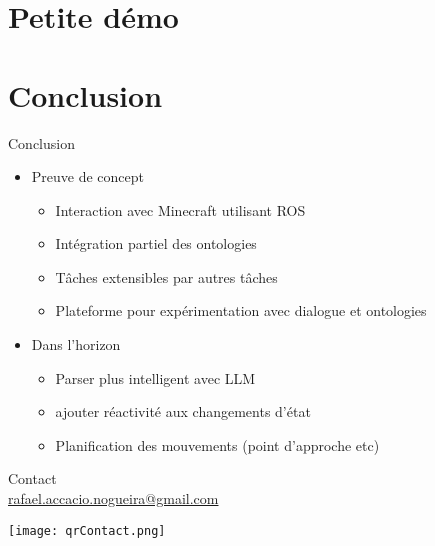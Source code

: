 \documentclass[aspectratio=169]{audition-beamer}
\begin{document}
\section{Petite démo}

\section{Conclusion}

\begin{frame}{Conclusion}
  \begin{itemize}[<+->]
    \item Preuve de concept
          \begin{itemize}[<+->]
            \item Interaction avec Minecraft utilisant ROS
            \item Intégration partiel des ontologies
            \item Tâches extensibles par autres tâches
            \item Plateforme pour expérimentation avec dialogue et ontologies
          \end{itemize}
  \end{itemize}

  \begin{itemize}[<+->]
    \item Dans l'horizon
          \begin{itemize}[<+->]
            \item Parser plus intelligent avec LLM
            \item ajouter réactivité aux changements d'état
            \item Planification des mouvements (point d'approche etc)
          \end{itemize}
  \end{itemize}
\end{frame}

\begin{frame}[plain]
  \centering
  \vfill
  \begin{minipage}[t]{.5\linewidth}
    \small
    \centering
    Contact\\
    \href{mailto:rafael.accacio.nogueira@gmail.com?subject=Seminaire RIS Minecraft}{rafael.accacio.nogueira@gmail.com}

    \texttt{[image: qrContact.png]}
  \end{minipage}
  \fi
\end{frame}

\appendix
\end{document}
